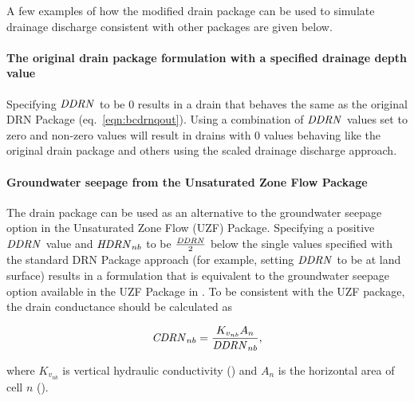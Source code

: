 A few examples of how the modified drain package can be used to simulate drainage discharge consistent with other \mf packages are given below.

\paragraph{The original drain package formulation with a specified drainage depth value}

Specifying $\mathit{DDRN}$ to be 0 results in a drain that behaves the same as the original DRN Package (eq.~\ref{eqn:bcdrnqout}). Using a combination of $\mathit{DDRN}$ values set to zero and non-zero values will result in drains with 0 values behaving like the original drain package and others using the scaled drainage discharge approach.

\paragraph{Groundwater seepage from the Unsaturated Zone Flow Package}

The drain package can be used as an alternative to the groundwater seepage option in the Unsaturated Zone Flow (UZF) Package. Specifying a positive $\mathit{DDRN}$ value and $\mathit{HDRN}_{nb}$ to be $\frac{\mathit{DDRN}}{2}$ below the single values specified with the standard DRN Package approach (for example, setting $\mathit{DDRN}$ to be at land surface) results in a formulation that is equivalent to the groundwater seepage option available in the UZF Package in \mf \citep{modflow6gwf}. To be consistent with the UZF package, the drain conductance should be calculated as

\begin{equation}
	\label{eqn:uzfcond}
	\mathit{CDRN}_{nb} = \frac{K_{v_{nb}} A_n}{\mathit{DDRN}_{nb}} ,
\end{equation}

\noindent where $K_{v_{nb}}$ is vertical hydraulic conductivity (\ult) and $A_n$ is the horizontal area of cell $n$ (\uls).
